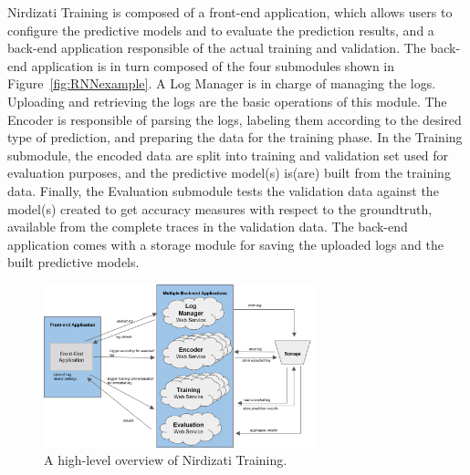 \documentclass[runningheads,a4paper]{llncs}
\begin{document}
Nirdizati Training is composed of a front-end application, which allows users to configure the predictive models
and to evaluate the prediction results, and a back-end application responsible of the actual training and validation.
The back-end application is in turn composed of the four submodules shown in Figure~\ref{fig:RNNexample}.
A Log Manager is in charge of managing the logs. Uploading and retrieving the logs are the basic operations
of this module. The Encoder is responsible of parsing the logs, labeling them according to the desired type of prediction,
 and preparing the data for the training phase.
In the Training submodule, the encoded data are split into training and validation set used for evaluation purposes,
and the predictive model(s) is(are) built from the training data. Finally, the Evaluation submodule
tests the validation data against the model(s) created to get accuracy measures with respect to the groundtruth,
available from the complete traces in the validation data.
The back-end application comes with a storage module for saving the uploaded logs and the built predictive models.


\begin{figure}[t]%
	\centering
	\includegraphics[width=0.7\textwidth]{img/nirdizati-training-architecture-rev}
	\caption{A high-level overview of Nirdizati Training.}
	\label{fig:nirdizati-training}
\end{figure}
\end{document}
